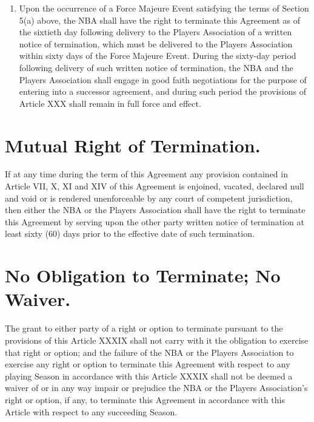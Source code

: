 \documentclass[
]{book}
\begin{document}
\begin{enumerate}
\item
  Upon the occurrence of a Force Majeure Event satisfying the terms of Section 5(a) above, the NBA shall have the right to terminate this Agreement as of the sixtieth day following delivery to the Players Association of a written notice of termination, which must be delivered to the Players Association within sixty days of the Force Majeure Event. During the sixty-day period following delivery of such written notice of termination, the NBA and the Players Association shall engage in good faith negotiations for the purpose of entering into a successor agreement, and during such period the provisions of Article XXX shall remain in full force and effect.
\end{enumerate}

\hypertarget{mutual-right-of-termination.}{%
\section{Mutual Right of Termination.}\label{mutual-right-of-termination.}}

If at any time during the term of this Agreement any provision contained in Article VII, X, XI and XIV of this Agreement is enjoined, vacated, declared null and void or is rendered unenforceable by any court of competent jurisdiction, then either the NBA or the Players Association shall have the right to terminate this Agreement by serving upon the other party written notice of termination at least sixty (60) days prior to the effective date of such termination.

\hypertarget{no-obligation-to-terminate-no-waiver.}{%
\section{No Obligation to Terminate; No Waiver.}\label{no-obligation-to-terminate-no-waiver.}}

The grant to either party of a right or option to terminate pursuant to the provisions of this Article XXXIX shall not carry with it the obligation to exercise that right or option; and the failure of the NBA or the Players Association to exercise any right or option to terminate this Agreement with respect to any playing Season in accordance with this Article XXXIX shall not be deemed a waiver of or in any way impair or prejudice the NBA or the Players Association's right or option, if any, to terminate this Agreement in accordance with this Article with respect to any succeeding Season.
\end{document}
